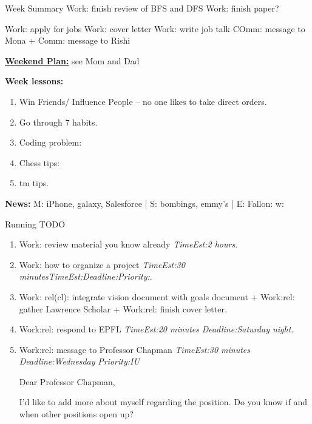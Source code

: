 \documentclass[serif, mathserif, final]{beamer}
\newcommand{\te}[1]{\textit{TimeEst:}\textit{#1}}
\newcommand{\dl}[1]{\textit{Deadline:}\textit{#1}}
\newcommand{\pr}[1]{\textit{Priority:}\textit{#1}}
\begin{document}
\begin{frame}
\begin{columns}
\begin{column}{0.5\linewidth}
\begin{block}{Week Summary}
Work: finish review of BFS and DFS 
Work: finish paper? 

Work: apply for jobs 
Work: cover letter
Work: write job talk  
COmm: message to Mona + Comm: message to Rishi 

        {\tiny \underline{\textbf{Weekend Plan:}} see Mom and Dad}

        {\tiny {\bf Week lessons:}}
        \begin{enumerate}
          \tiny \item \tiny Win Friends/ Influence People – no one
          likes to take direct orders.
        \item \tiny Go through 7 habits.
        \item \tiny Coding problem: 
        \item \tiny Chess tips: 
        \item \tiny tm tips.
        \end{enumerate} 

        
        {{\tiny \bf News:} M: iPhone, galaxy, Salesforce | S: bombings, emmy's | E: Fallon:  w:  }
        
      \begin{block}{Running TODO} %
        \begin{enumerate} 
          
          \textbf{Curr} $\rightarrow$

      \item \tiny Work: review material you know already \te{2 hours}. 

      \item \tiny Work: how to organize a project \te{30
        minutes}\te{}\dl{}\pr{}. 
        
      \item \tiny Work: rel(cl): integrate vision document with goals
        document + Work:rel: gather Lawrence Scholar +  Work:rel:
        finish cover letter. 

      \item \tiny Work:rel: respond to EPFL \te{20 minutes}
        \dl{Saturday night}. 

      \item \tiny Work:rel: message to Professor Chapman \te{30 minutes} \dl{Wednesday} \pr{IU} 

        Dear Professor Chapman, 
        
        I'd like to add more about myself regarding the position. 
        Do you know if and when other positions open up?


\end{enumerate}
\end{block}
\end{block}
\end{column}
\end{columns}
\end{frame}
\end{document}
